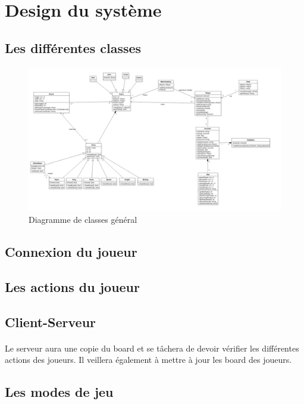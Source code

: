 \documentclass[10pt, a4paper]{article}
\begin{document}
\section{Design du système}

\subsection{Les différentes classes}
	
\begin{figure}[p]
\includegraphics[scale=0.5]{ClassDiagram.png}
\caption{Diagramme de classes général}
\label{CD} %
\end{figure}

		
\subsection{Connexion du joueur}
		
\subsection{Les actions du joueur}

\subsection{Client-Serveur}
\paragraph{}Le serveur aura une copie du board et se tâchera de devoir vérifier les différentes actions des joueurs. Il veillera également à mettre à jour les board des joueurs.

\subsection{Les modes de jeu}
\end{document}
